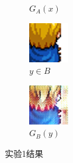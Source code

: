 \documentclass[twocolumn,11pt]{ctexart}
\begin{document}
\begin{figure}[htb]
\begin{subfigure}[b]{0.24\linewidth}
        \caption{$G_A(x)$}
      \end{subfigure}
      \begin{subfigure}[b]{0.24\linewidth}
        \includegraphics[width=\linewidth]{exp1_real_B.png}
        \caption{$y \in B$}
      \end{subfigure}
      \begin{subfigure}[b]{0.24\linewidth}
        \includegraphics[width=\linewidth]{exp1_fake_A.png}
        \caption{$G_B(y)$}
      \end{subfigure}
      \caption{实验1结果}
      \label{fig:exp1}
\end{figure}
\end{document}
